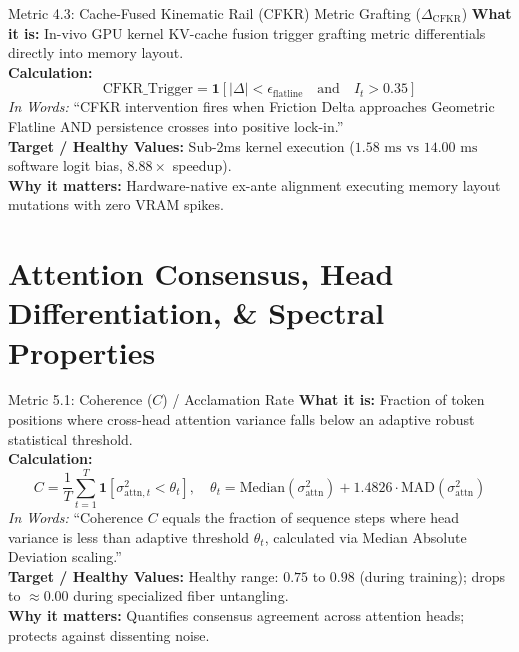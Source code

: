\documentclass[11pt,a4paper]{article}
\begin{document}
\begin{metricbox}{Metric 4.3: Cache-Fused Kinematic Rail (CFKR) Metric Grafting ($\Delta_{\text{CFKR}}$)}
\textbf{What it is:} In-vivo GPU kernel KV-cache fusion trigger grafting metric differentials directly into memory layout.\\
\textbf{Calculation:}
 $$\text{CFKR\_Trigger} = \mathbf{1}\left[|\Delta| < \epsilon_{\text{flatline}} \quad \text{and} \quad I_t > 0.35\right]$$ \emph{In Words:} ``CFKR intervention fires when Friction Delta approaches Geometric Flatline AND persistence crosses into positive lock-in.''\\
\textbf{Target / Healthy Values:} Sub-2ms kernel execution ($1.58\text{ ms vs } 14.00\text{ ms}$ software logit bias, $8.88\times$ speedup).\\
\textbf{Why it matters:} Hardware-native ex-ante alignment executing memory layout mutations with zero VRAM spikes.
\end{metricbox}

\section{Attention Consensus, Head Differentiation, \& Spectral Properties}

\begin{metricbox}{Metric 5.1: Coherence ($C$) / Acclamation Rate}
\textbf{What it is:} Fraction of token positions where cross-head attention variance falls below an adaptive robust statistical threshold.\\
\textbf{Calculation:}
 $$C = \frac{1}{T} \sum_{t=1}^T \mathbf{1}\left[\sigma_{\text{attn}, t}^2 < \theta_t\right], \quad \theta_t = \text{Median}(\sigma_{\text{attn}}^2) + 1.4826 \cdot \text{MAD}(\sigma_{\text{attn}}^2)$$ \emph{In Words:} ``Coherence $C$ equals the fraction of sequence steps where head variance is less than adaptive threshold $\theta_t$, calculated via Median Absolute Deviation scaling.''\\
\textbf{Target / Healthy Values:} Healthy range: $0.75$ to $0.98$ (during training); drops to $\approx 0.00$ during specialized fiber untangling.\\
\textbf{Why it matters:} Quantifies consensus agreement across attention heads; protects against dissenting noise.
\end{metricbox}
\end{document}
